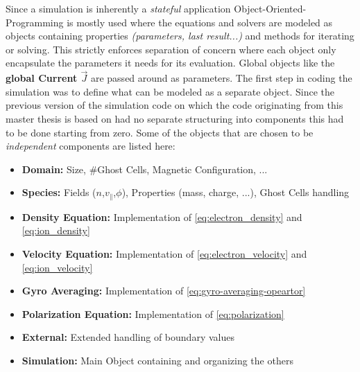 \documentclass[master.tex]{subfiles}
\begin{document}
Since a simulation is inherently a \textit{stateful} application Object-Oriented-Programming is mostly used where the equations and solvers are modeled as objects containing properties \textit{(parameters, last result...)} and methods for iterating or solving. This strictly enforces separation of concern where each object only encapsulate the parameters it needs for its evaluation. Global objects like the \textbf{global Current $\vec{J}$} are passed around as parameters.\newline
The first step in coding the simulation was to define what can be modeled as a separate object. Since the previous version of the simulation code on which the code originating from this master thesis is based on  had no separate structuring into components this had to be done starting from zero.\newline
Some of the objects that are chosen to be \textit{independent} components are listed here:
  
\begin{itemize}
  
  \item \textbf{Domain:} Size, \#Ghost Cells, Magnetic Configuration, ...
  \item \textbf{Species:} Fields ($n$,$v_\parallel$,$\phi$), Properties (mass, charge, ...), Ghost Cells handling
  \item \textbf{Density Equation:} Implementation of \autoref{eq:electron_density} and \autoref{eq:ion_density}
  \item \textbf{Velocity Equation:} Implementation of \autoref{eq:electron_velocity} and \autoref{eq:ion_velocity}
  \item \textbf{Gyro Averaging:} Implementation of \autoref{eq:gyro-averaging-opeartor}
  \item \textbf{Polarization Equation:} Implementation of \autoref{eq:polarization}
  \item \textbf{External:} Extended handling of boundary values
  \item \textbf{Simulation:} Main Object containing and organizing the others
  \end{itemize}
\end{document}
